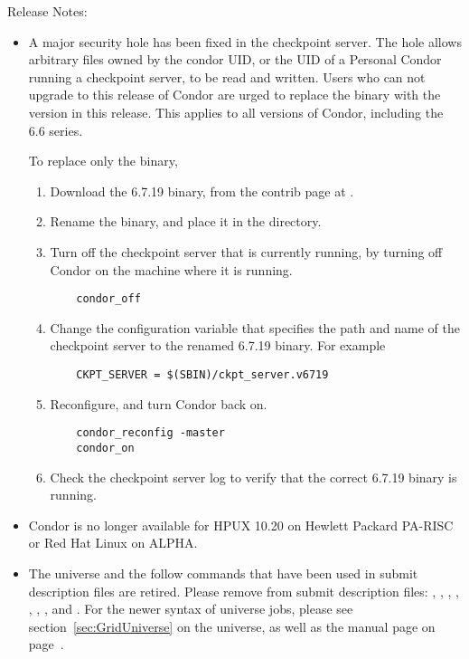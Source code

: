 \noindent Release Notes:

\begin{itemize}

\item A major security hole has been fixed in the checkpoint server.
The hole allows arbitrary
files owned by the condor UID, or the UID of a Personal Condor running a
checkpoint server, to be read and written. Users who can not upgrade
to this release of Condor are urged to replace the 
binary
with the version in this release. This applies to all versions of Condor,
including the 6.6 series.

To replace only the  binary,
  \begin{enumerate}
  \item Download the 6.7.19  binary,
  from the contrib page at
  .
  \item Rename the binary, and place it in the
   directory.
  \item Turn off the checkpoint server that is currently running,
  by turning off Condor on the machine where it is running.
  \begin{verbatim}
    condor_off 
  \end{verbatim}
  \item Change the configuration variable that specifies the
  path and name of the checkpoint server to the renamed 
  6.7.19  binary.
  For example
  \begin{verbatim}
    CKPT_SERVER = $(SBIN)/ckpt_server.v6719
  \end{verbatim}
  \item Reconfigure, and turn Condor back on.
  \begin{verbatim}
    condor_reconfig -master 
    condor_on
  \end{verbatim}
  \item Check the checkpoint server log to verify that the
  correct 6.7.19  binary is running.
  \end{enumerate}

\item Condor is no longer available for HPUX 10.20 on Hewlett
Packard PA-RISC or Red Hat Linux on ALPHA.

\item The  universe and the follow commands
that have been used in submit description files are retired.
Please remove from submit description files:
, ,
, ,
, ,
, and .
For the newer syntax of  universe jobs,
please see
section~\ref{sec:GridUniverse} on the  universe,
as well as the  manual page
on page~\pageref{man-condor-submit}.


\end{itemize}
